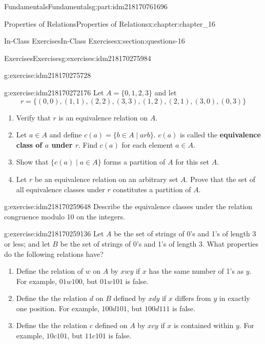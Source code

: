 \documentclass[oneside,10pt,]{book}
\newcommand{\terminology}[1]{\textbf{#1}}
\numberwithin{equation}{section}
\begin{document}
\begin{partptx}{Fundamentals}{}{Fundamentals}{}{}{g:part:idm218170761696}
\begin{chapterptx}{Properties of Relations}{}{Properties of Relations}{}{}{x:chapter:chapter_16}
\begin{sectionptx}{In-Class Exercises}{}{In-Class Exercises}{}{}{x:section:questions-16}
\begin{exercises-subsection-numberless}{Exercises}{}{Exercises}{}{}{g:exercises:idm218170275984}
\begin{exercisegroup}
\begin{divisionexerciseeg}{1}{}{}{g:exercise:idm218170275728}
\begin{enumerate}[label=(\alph*)]
\end{enumerate}
%
\end{divisionexerciseeg}%
\begin{divisionexerciseeg}{2}{}{}{g:exercise:idm218170272176}%
Let \(A = \{0, 1, 2, 3\}\) and let%
\begin{equation*}
r = \{(0, 0), (1, 1), (2, 2), (3, 3), (1, 2), (2, 1), (3, 0), (0, 3)\}
\end{equation*}
%
\begin{enumerate}[label=(\alph*)]
\item{}Verify that \(r\) is an equivalence relation on \(A\).%
\item{}Let \(a \in A\) and define \(c(a) = \{b \in A \mid a rb\}\). \label{g:notation:idm218170267632} \(c(a)\) is called the \terminology{equivalence class of \(a\) under \(r\)}. Find \(c(a)\) for each element \(a \in A\).%
\item{}Show that \(\{c(a) \mid  a \in A\}\) forms a partition of \(A\) for this set \(A\).%
\item{}Let \(r\) be an equivalence relation on an arbitrary set \(A\). Prove that the set of all equivalence classes under \(r\) constitutes a partition of \(A\).%
\end{enumerate}
%
\end{divisionexerciseeg}%
\begin{divisionexerciseeg}{3}{}{}{g:exercise:idm218170259648}%
Describe the equivalence classes under the relation congruence modulo 10 on the integers.%
\end{divisionexerciseeg}%
\begin{divisionexerciseeg}{4}{}{}{g:exercise:idm218170259136}%
Let \(A\) be the set of strings of 0's and 1's of length 3 or less; and let \(B\) be the set of strings of 0's and 1's of length 3. What properties do the following relations have?%
\begin{enumerate}[label=(\alph*)]
\item{}Define the relation of \(w\) on \(A\) by \(x w y\) if \(x\) has the same number of 1's as \(y\). For example, \(01 w 100\), but \(01 w 101\) is false.%
\item{}Define the the relation \(d\)  on \(B\) defined by \(x d y\) if \(x\) differs from \(y\) in exactly one position. For example, \(100 d 101\), but \(100 d 111\) is false.%
\item{}Define the the relation \(c\) defined  on \(A\) by \(x c y\) if \(x\) is contained within \(y\). For example, \(10 c 101\), but \(11 c 101\) is false.%

\end{enumerate}
\end{divisionexerciseeg}
\end{exercisegroup}
\end{exercises-subsection-numberless}
\end{sectionptx}
\end{chapterptx}
\end{partptx}
\end{document}
